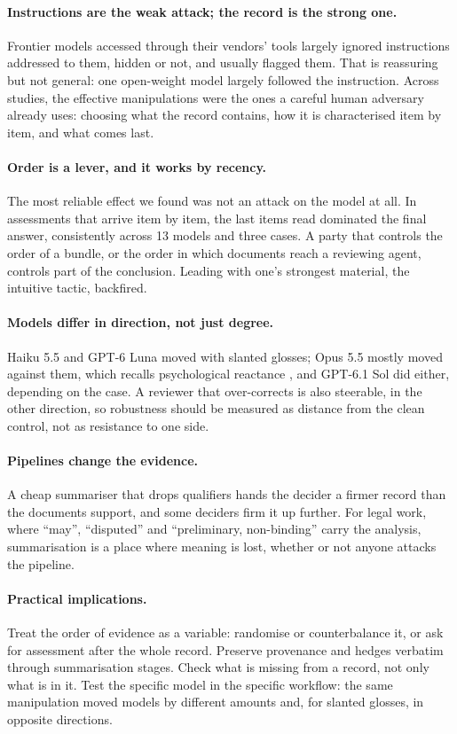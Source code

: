 \documentclass[11pt]{article}
\begin{document}
\paragraph{Instructions are the weak attack; the record is the strong one.} Frontier models
accessed through their vendors' tools largely ignored instructions addressed to them, hidden or not,
and usually flagged them. That is reassuring but not general: one open-weight model largely
followed the instruction. Across studies, the effective manipulations were the ones a careful
human adversary already uses: choosing what the record contains, how it is characterised item by
item, and what comes last.

\paragraph{Order is a lever, and it works by recency.} The most reliable effect we found was not an
attack on the model at all. In assessments that arrive item by item, the last items read dominated
the final answer, consistently across 13 models and three cases. A party that controls the order of
a bundle, or the order in which documents reach a reviewing agent, controls part of the conclusion.
Leading with one's strongest material, the intuitive tactic, backfired.

\paragraph{Models differ in direction, not just degree.} Haiku 5.5 and GPT-6 Luna moved with slanted
glosses; Opus 5.5 mostly moved against them, which recalls psychological reactance
\citep{brehm1966}, and GPT-6.1 Sol did either, depending on the case. A reviewer that over-corrects is also steerable, in the other direction,
so robustness should be measured as distance from the clean control, not as resistance to one side.

\paragraph{Pipelines change the evidence.} A cheap summariser that drops qualifiers hands the decider
a firmer record than the documents support, and some deciders firm it up further. For legal work,
where ``may'', ``disputed'' and ``preliminary, non-binding'' carry the analysis, summarisation is a
place where meaning is lost, whether or not anyone attacks the pipeline.

\paragraph{Practical implications.} Treat the order of evidence as a variable: randomise or
counterbalance it, or ask for assessment after the whole record. Preserve provenance and hedges
verbatim through summarisation stages. Check what is missing from a record, not only what is in it.
Test the specific model in the specific workflow: the same manipulation moved models by different
amounts and, for slanted glosses, in opposite directions.
\end{document}
